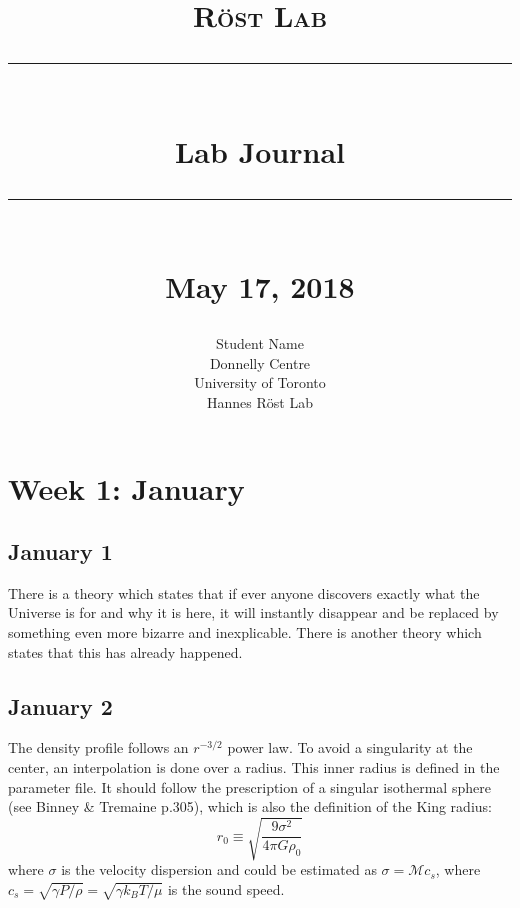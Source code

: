 \documentclass[12pt]{report}
\newcommand{\HRule}[1]{\rule{\linewidth}{#1}}
\begin{document}
\title{ \textsc{Röst Lab}
		\\ [2.0cm]
		\HRule{0.5pt} \\
		\LARGE \textbf{{Lab Journal}}
		\HRule{2pt} \\ [0.5cm]
		\normalsize May 17, 2018\vspace*{5\baselineskip}}

\date{}

\author{
		Student Name \\ 
		Donnelly Centre\\
		University of Toronto \\
		Hannes Röst Lab }

\maketitle
\tableofcontents
\newpage

\sectionfont{\scshape}
\renewcommand\thesection{\arabic{section}.}
\renewcommand\thesubsection{\thesection\arabic{subsection}}
\sectionfont{\fontsize{8}{10}}


\section{Week 1: January}
\subsection{January 1}

There is a theory which states that if ever anyone discovers exactly what the Universe is for and why it is here, it will instantly disappear and be replaced by something even more bizarre and inexplicable.
There is another theory which states that this has already happened. 

\subsection{January 2}

The density profile follows an $r^{-3/2}$ power law. To avoid a singularity at the center, an interpolation is done over a radius. This inner radius is defined in the parameter file. It should follow the prescription of a singular isothermal sphere (see Binney \& Tremaine p.305), which is also the definition of the King radius:
\begin{equation}
r_0 \equiv \sqrt{\frac{9\sigma^2}{4\pi G\rho_0}}
\end{equation}
where $\sigma$ is the velocity dispersion and could be estimated as $\sigma = \mathcal{M} c_s$, where $c_s = \sqrt{\gamma P/\rho} = \sqrt{\gamma k_B T / \mu}$ is the sound speed.
\end{document}
